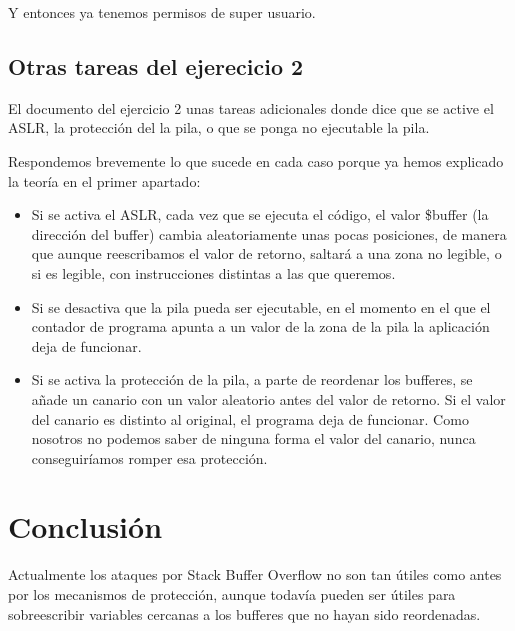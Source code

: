 \documentclass[]{article}
\begin{document}
Y entonces ya tenemos permisos de super usuario.

\subsection{Otras tareas del ejerecicio 2}
El documento del ejercicio 2 unas tareas adicionales donde dice que se active el ASLR, la protección del la pila, o que se ponga no ejecutable la pila.

\vspace{10pt}

Respondemos brevemente lo que sucede en cada caso porque ya hemos explicado la teoría en el primer apartado:

\begin{itemize} 
	\item Si se activa el ASLR, cada vez que se ejecuta el código, el valor \$buffer (la dirección del buffer) cambia aleatoriamente unas pocas posiciones, de manera que aunque reescribamos el valor de retorno, saltará a una zona no legible, o si es legible, con instrucciones distintas a las que queremos.
	\item Si se desactiva que la pila pueda ser ejecutable, en el momento en el que el contador de programa apunta a un valor de la zona de la pila la aplicación deja de funcionar.
	\item Si se activa la protección de la pila, a parte de reordenar los bufferes, se añade un canario con un valor aleatorio antes del valor de retorno. Si el valor del canario es distinto al original, el programa deja de funcionar. Como nosotros no podemos saber de ninguna forma el valor del canario, nunca conseguiríamos romper esa protección.	
\end{itemize}

\section{Conclusión}

Actualmente los ataques por Stack Buffer Overflow no son tan útiles como antes por los mecanismos de protección, aunque todavía pueden ser útiles para sobreescribir variables cercanas a los bufferes que no hayan sido reordenadas.

\newpage



\end{document}
